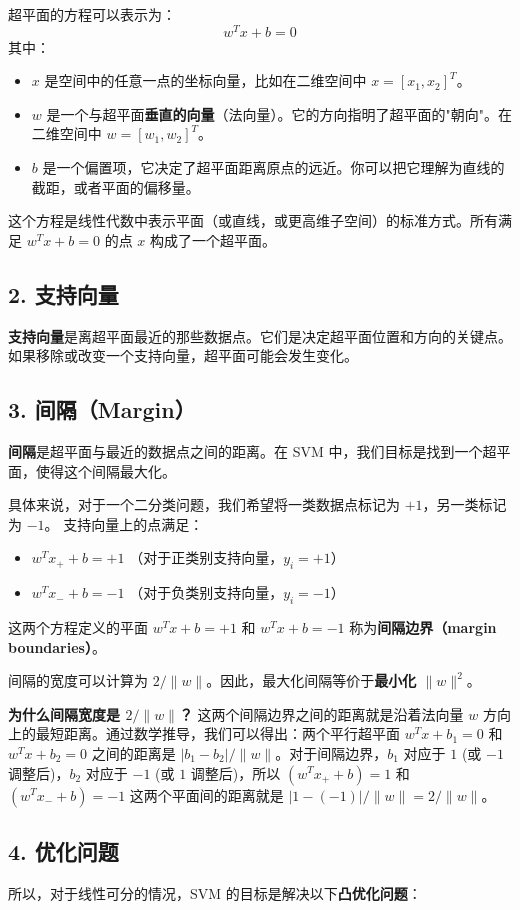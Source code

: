 \documentclass{article}
\begin{document}
超平面的方程可以表示为：
$$w^T x + b = 0$$
其中：
\begin{itemize}
    \item $x$ 是空间中的任意一点的坐标向量，比如在二维空间中 $x = [x_1, x_2]^T$。
    \item $w$ 是一个与超平面\textbf{垂直的向量}（法向量）。它的方向指明了超平面的"朝向"。在二维空间中 $w = [w_1, w_2]^T$。
    \item $b$ 是一个偏置项，它决定了超平面距离原点的远近。你可以把它理解为直线的截距，或者平面的偏移量。
\end{itemize}
这个方程是线性代数中表示平面（或直线，或更高维子空间）的标准方式。所有满足 $w^T x + b = 0$ 的点 $x$ 构成了一个超平面。

\subsection*{2. 支持向量}
\textbf{支持向量}是离超平面最近的那些数据点。它们是决定超平面位置和方向的关键点。如果移除或改变一个支持向量，超平面可能会发生变化。

\subsection*{3. 间隔（Margin）}
\textbf{间隔}是超平面与最近的数据点之间的距离。在 SVM 中，我们目标是找到一个超平面，使得这个间隔最大化。

具体来说，对于一个二分类问题，我们希望将一类数据点标记为 $+1$，另一类标记为 $-1$。
支持向量上的点满足：
\begin{itemize}
    \item $w^T x_+ + b = +1$ （对于正类别支持向量，$y_i = +1$）
    \item $w^T x_- + b = -1$ （对于负类别支持向量，$y_i = -1$）
\end{itemize}
这两个方程定义的平面 $w^T x + b = +1$ 和 $w^T x + b = -1$ 称为\textbf{间隔边界（margin boundaries）}。

间隔的宽度可以计算为 $2 / \|w\|$。因此，最大化间隔等价于\textbf{最小化 $\|w\|^2$}。

\textbf{为什么间隔宽度是 $2 / \|w\|$？}
这两个间隔边界之间的距离就是沿着法向量 $w$ 方向上的最短距离。通过数学推导，我们可以得出：两个平行超平面 $w^T x + b_1 = 0$ 和 $w^T x + b_2 = 0$ 之间的距离是 $|b_1 - b_2| / \|w\|$。对于间隔边界，$b_1$ 对应于 $1$ (或 $-1$ 调整后)，$b_2$ 对应于 $-1$ (或 $1$ 调整后)，所以 $(w^T x_+ + b) = 1$ 和 $(w^T x_- + b) = -1$ 这两个平面间的距离就是 $|1 - (-1)| / \|w\| = 2 / \|w\|$。

\subsection*{4. 优化问题}
所以，对于线性可分的情况，SVM 的目标是解决以下\textbf{凸优化问题}：
\end{document}
